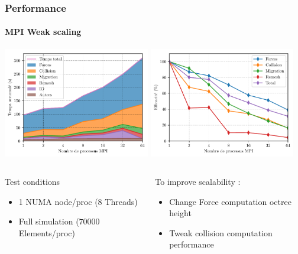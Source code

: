 \documentclass[aspectratio=1610,t,10pt]{beamer}
\begin{document}
\begin{frame}
\frametitle{Performance}
\framesubtitle{MPI Weak scaling}
\centering
\includegraphics[width=0.48\textwidth]{img/bench_mpi_weak_times} \includegraphics[width=0.48\textwidth]{img/bench_mpi_weak_eff}
\begin{columns}[c]
    \begin{column}{.48\textwidth}
        \begin{block}{Test conditions}
            \begin{itemize}
                \item 1 NUMA node/proc (8 Threads)
                \item Full simulation ($70 000$ Elements/proc)
            \end{itemize}
        \end{block}
    \end{column}
    \begin{column}{.48\textwidth}
        \begin{block}{To improve scalability : }
            \begin{itemize}
                \item Change Force computation octree height
                \item Tweak collision computation performance
            \end{itemize}
        \end{block}
    \end{column}
\end{columns}
\end{frame}
\end{document}
